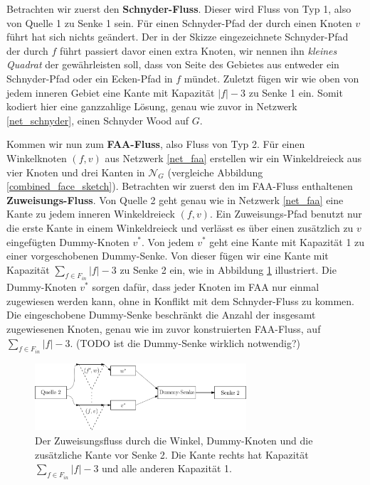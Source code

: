 Betrachten wir zuerst den \textbf{Schnyder-Fluss}. Dieser wird Fluss von Typ 1, also von Quelle 1 zu Senke 1 sein. Für einen Schnyder-Pfad der durch einen Knoten $v$ führt hat sich nichts geändert. Der in der Skizze eingezeichnete Schnyder-Pfad der durch $f$ führt passiert davor einen extra Knoten, wir nennen ihn \textit{kleines Quadrat} der gewährleisten soll, dass von Seite des Gebietes aus entweder ein Schnyder-Pfad oder ein Ecken-Pfad in $f$ mündet. Zuletzt fügen wir wie oben von jedem inneren Gebiet eine Kante mit Kapazität $|f|-3$ zu Senke 1 ein. Somit kodiert hier eine ganzzahlige Lösung, genau wie zuvor in Netzwerk \ref{net_schnyder}, einen Schnyder Wood auf $G$.

Kommen wir nun zum \textbf{FAA-Fluss}, also Fluss von Typ 2. Für einen Winkelknoten $(f,v)$ aus Netzwerk \ref{net_faa} erstellen wir ein Winkeldreieck aus vier Knoten und drei Kanten in $\mathcal{N}_G$ (vergleiche Abbildung \ref{combined_face_sketch}). Betrachten wir zuerst den im FAA-Fluss enthaltenen \textbf{Zuweisungs-Fluss}. Von Quelle 2 geht genau wie in Netzwerk \ref{net_faa} eine Kante zu jedem inneren Winkeldreieck $(f,v)$. Ein Zuweisungs-Pfad benutzt nur die erste Kante in einem Winkeldreieck und verlässt es über einen zusätzlich zu $v$ eingefügten Dummy-Knoten $v^*$. Von jedem $v^*$ geht eine Kante mit Kapazität 1 zu einer vorgeschobenen Dummy-Senke. Von dieser fügen wir eine Kante mit Kapazität $\sum_{f \in F_{in}} |f|-3$ zu Senke 2 ein, wie in Abbildung \ref{dummy_sink} illustriert. Die Dummy-Knoten $v^*$ sorgen dafür, dass jeder Knoten im FAA nur einmal zugewiesen werden kann, ohne in Konflikt mit dem Schnyder-Fluss zu kommen. Die eingeschobene Dummy-Senke beschränkt die Anzahl der insgesamt zugewiesenen Knoten, genau wie im zuvor konstruierten FAA-Fluss, auf $\sum_{f \in F_{in}} |f|-3$. (TODO ist die Dummy-Senke wirklich notwendig?)

\begin{figure}[h]
	\centering
  	\includegraphics[width=0.7\textwidth]{dummy_sink.png}
  	\caption{Der Zuweisungsfluss durch die Winkel, Dummy-Knoten und die zusätzliche Kante vor Senke 2. Die Kante rechts hat Kapazität $\sum_{f \in F_{in}} |f|-3$ und alle anderen Kapazität 1.}
	\label{dummy_sink}
\end{figure}

